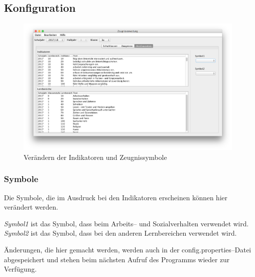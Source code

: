 \documentclass[a4paper,notitlepage,parskip]{scrartcl}
\newcommand\ott{\normalfont\ttfamily}
\begin{document}
\subsection{Konfiguration}
\begin{figure}[H]
\centering
\centerline{\includegraphics[width=1.0\textwidth]{Konfiguration}}
\caption{Verändern der Indikatoren und Zeugnissymbole}
\label{fig:Konfiguration}
\end{figure}
\subsubsection{Symbole}
Die Symbole, die im Ausdruck bei den Indikatoren erscheinen können hier verändert werden.

\emph{Symbol1} ist das Symbol, dass beim Arbeits-- und Sozialverhalten verwendet wird. \emph{Symbol2} ist das Symbol, dass bei den anderen Lernbereichen verwendet wird.

Änderungen, die hier gemacht werden, werden auch in der {\ott config.properties}--Datei abgespeichert und stehen beim nächsten Aufruf des Programms wieder zur Verfügung.
\end{document}

